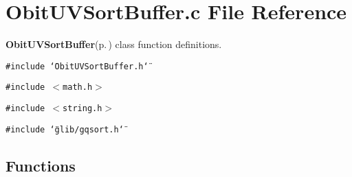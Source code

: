 \section{Obit\-UVSort\-Buffer.c File Reference}
\label{ObitUVSortBuffer_8c}
{\bf Obit\-UVSort\-Buffer}{\rm (p.\,\pageref{structObitUVSortBuffer})} class function definitions. 

{\tt \#include \char`\"{}Obit\-UVSort\-Buffer.h\char`\"{}}\par
{\tt \#include $<$math.h$>$}\par
{\tt \#include $<$string.h$>$}\par
{\tt \#include \char`\"{}glib/gqsort.h\char`\"{}}\par
\subsection*{Functions}
